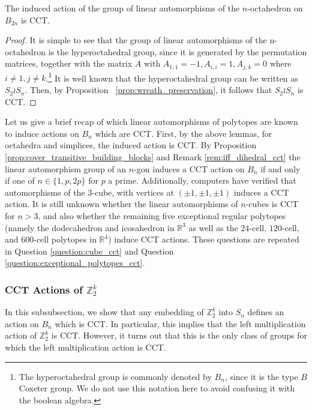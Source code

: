 \documentclass[smallextended, envcountsame, numbook]{svjour3}
\numberwithin{equation}{section}
\newcommand\sssec{\subsubsection}
\begin{document}
\begin{proposition}
The induced action of the group of linear automorphisms of the $n$-octahedron on $B_{2n}$ is CCT.
\end{proposition}
\begin{proof}
It is simple to see that the group of linear automorphisms of the n-octahedron is the hyperoctahedral group, since it is generated by the permutation matrices, together with the matrix $A$ with $A_{1,1} = -1,A_{i,i} = 1,A_{j,k} = 0$ where $i \neq 1, j \neq k$.\footnote{The hyperoctahedral group is commonly denoted by $B_n$, since it is the type $B$ Coxeter group. We do not use this notation here to avoid confusing it with the boolean algebra.} It is well known that the hyperoctahedral group can be written as $S_2 \wr S_n$. Then, by Proposition ~\ref{prop:wreath_preservation}, it follows that $S_2 \wr S_n$ is CCT.
\end{proof}

\begin{remark}
Let us give a brief recap of which linear automorphisms of polytopes are known to induce actions on $B_n$ which are CCT. First, by the above lemmas, for octahedra and simplices, the induced action is CCT. By Proposition  \ref{prop:cover_transitive_building_blocks} and Remark \ref{rem:iff_dihedral_cct} the linear automorphism group of an $n$-gon induces a CCT action on $B_n$ if and only if one of $n\in \{1,p,2p\}$ for $p$ a prime. Additionally, computers have verified that automorphisms of the 3-cube, with vertices at $(\pm 1,\pm 1,\pm 1)$ induces a CCT action. It is still unknown whether the linear automorphisms of $n$-cubes is CCT for $n> 3$, and also whether the remaining five exceptional regular polytopes (namely the dodecahedron and icosahedron in $\mathbb R^3$ as well as the $24$-cell, $120$-cell, and $600$-cell polytopes in $\mathbb R^4$) induce CCT actions. These questions are repeated in Question \ref{question:cube_cct} and Question \ref{question:exceptional_polytopes_cct}.

\end{remark}

\sssec{CCT Actions of $\mathbb Z_2^k$}

In this subsubsection, we show that any embedding of $\mathbb Z_2^k$ into $S_n$ defines an action on $B_n$ which is CCT. In particular, this implies that the left multiplication action of $\mathbb Z_2^k$ is CCT. However, it turns out that this is the only class of groups for which the left multiplication action is CCT.
\end{document}

